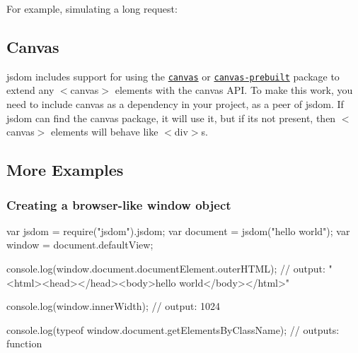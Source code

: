 For example, simulating a long request\+:




\subsection*{Canvas}

jsdom includes support for using the \href{https://npmjs.org/package/canvas}{\tt canvas} or \href{https://npmjs.org/package/canvas-prebuilt}{\tt canvas-\/prebuilt} package to extend any {\ttfamily $<$canvas$>$} elements with the canvas A\+PI. To make this work, you need to include canvas as a dependency in your project, as a peer of jsdom. If jsdom can find the canvas package, it will use it, but if it\textquotesingle{}s not present, then {\ttfamily $<$canvas$>$} elements will behave like {\ttfamily $<$div$>$}s.

\subsection*{More Examples}

\subsubsection*{Creating a browser-\/like window object}


\begin{DoxyCode}
var jsdom = require("jsdom").jsdom;
var document = jsdom("hello world");
var window = document.defaultView;

console.log(window.document.documentElement.outerHTML);
// output: "<html><head></head><body>hello world</body></html>"

console.log(window.innerWidth);
// output: 1024

console.log(typeof window.document.getElementsByClassName);
// outputs: function
\end{DoxyCode}


